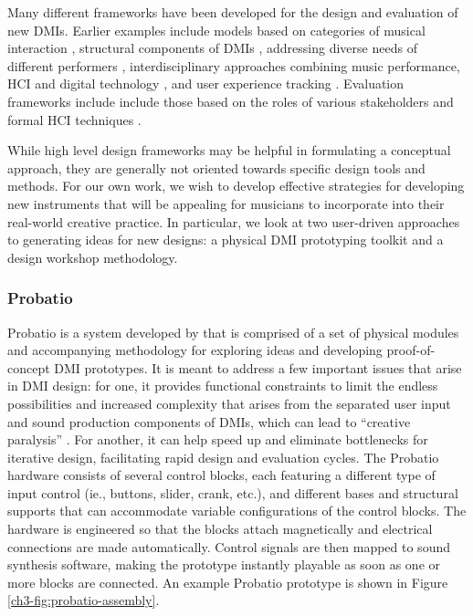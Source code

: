 \documentclass[letterpaper, 12pt]{article}
\begin{document}
Many different frameworks have been developed for the design and evaluation of new DMIs. Earlier examples include models based on categories of musical interaction \citep{Bongers2000a}, structural components of DMIs \citep{Wanderley2004}, addressing diverse needs of different performers \citep{Jorda2004, Jorda2004b}, interdisciplinary approaches combining music performance, HCI and digital technology \citep{Overholt2009}, and user experience tracking \citep{fmorreale:2014}. Evaluation frameworks include include those based on the roles of various stakeholders \citep{OModhrain2011a} and formal HCI techniques \citep{Young2015a}.


While high level design frameworks may be helpful in formulating a conceptual approach, they are generally not oriented towards specific design tools and methods. For our own work, we wish to develop effective strategies for developing new instruments that will be appealing for musicians to incorporate into their real-world creative practice. In particular, we look at two user-driven approaches to generating ideas for new designs: a physical DMI prototyping toolkit and a design workshop methodology. 

\subsubsection{Probatio}
\label{ch3-sec:probatio}

Probatio is a system developed by \citet{Calegario2019} that is comprised of a set of physical modules and accompanying methodology for exploring ideas and developing proof-of-concept DMI prototypes. It is meant to address a few important issues that arise in DMI design: for one, it provides functional constraints to limit the endless possibilities and increased complexity that arises from the separated user input and sound production components of DMIs, which can lead to ``creative paralysis'' \citep{Magnusson2010}. For another, it can help speed up and eliminate bottlenecks for iterative design, facilitating rapid design and evaluation cycles. The Probatio hardware consists of several control blocks, each featuring a different type of input control (ie., buttons, slider, crank, etc.), and different bases and structural supports that can accommodate variable configurations of the control blocks. The hardware is engineered so that the blocks attach magnetically and electrical connections are made automatically. Control signals are then mapped to sound synthesis software, making the prototype instantly playable as soon as one or more blocks are connected. An example Probatio prototype is shown in Figure \ref{ch3-fig:probatio-assembly}.
\end{document}
